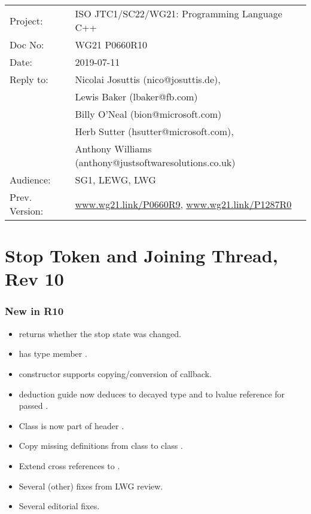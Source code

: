 
{\small
\begin{tabular}{@{}ll}
Project:  	& ISO JTC1/SC22/WG21: Programming Language C++ \\
Doc No: 	& WG21 P0660R10 \\
Date: 		& 2019-07-11 \\
Reply to: 	& Nicolai Josuttis (nico@josuttis.de), \\
                &         Lewis Baker (lbaker@fb.com) \\
                &         Billy O'Neal (bion@microsoft.com) \\
                &         Herb Sutter (hsutter@microsoft.com), \\
                &         Anthony Williams (anthony@justsoftwaresolutions.co.uk) \\
Audience: 	& SG1, LEWG, LWG \\
Prev. Version:	& \url{www.wg21.link/P0660R9}, \url{www.wg21.link/P1287R0} \\
\end{tabular}
}

\section*{{\huge{}Stop Token and Joining Thread, Rev 10}}

\subsubsection*{New in R10}
\begin{itemize}
 \item {} returns whether the stop state was changed.
 \item {} has type member .
 \item {} constructor supports copying/conversion of callback.
 \item {} deduction guide now deduces to decayed type
       and to lvalue reference for passed .
 \item Class  is now part of header .
 \item Copy missing definitions from class  to class .
 \item Extend cross references to .
 \item Several (other) fixes from LWG review.
 \item Several editorial fixes.
\end{itemize}

